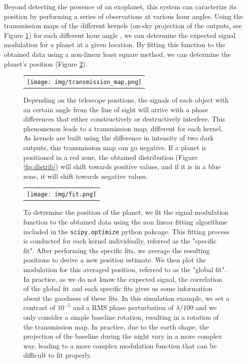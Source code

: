 \documentclass[]{spie}  %
\begin{document}
Beyond detecting the presence of an exoplanet, this system can caracterize its position by performing a series of observations at various hour angles. Using the transmission maps of the different kernels (on-sky projection of the outputs, see Figure \ref{fig:transmission_map}) for each different hour angle \cite{Chingaipe}, we can determine the expected signal modulation for a planet at a given location. By fitting this function to the obtained data using a non-linear least square method, we can determine the planet's position (Figure \ref{fig:fit}).

\begin{figure} [H]
    \begin{center}
    \begin{tabular}{c}
    \texttt{[image: img/transmission\_map.png]}
    \end{tabular}
    \end{center}
    \caption[transmission_map] 
    { \label{fig:transmission_map} 
    Depending on the telescope positions, the signals of each object with an certain angle from the line of sight will arrive with a phase differences that either constructively or destructively interfere. This phenomenon leads to a transmission map, different for each kernel. As kernels are built using the difference in intensity of two dark outputs, this transmission map can go negative. If a planet is positioned in a red zone, the obtained distribution (Figure \ref{fig:distrib}) will shift towards positive values, and if it is in a blue zone, it will shift towards negative values.}
\end{figure}

\begin{figure} [H]
    \begin{center}
    \begin{tabular}{c}
    \texttt{[image: img/fit.png]}
    \end{tabular}
    \end{center}
    \caption[fit] 
    {\label{fig:fit} 
    To determine the position of the planet, we fit the signal modulation function to the obtained data using the non linear fitting algorithme included in the \lstinline{scipy.optimize} python pakcage. This fitting process is conducted for each kernel individually, referred as the "specific fit". After performing the specific fits, we average the resulting positions to derive a new position estimate. We then plot the modulation for this averaged position, referred to as the "global fit". In practice, as we do not know the expected signal, the correlation of the global fit and each specific fits gives us some information about the goodness of these fits. In this simulation example, we set a contrast of $10^{-5}$ and a RMS phase perturbation of $\lambda / 100$ and we only consider a simple baseline rotation, resulting in a rotation of the transmission map. In practice, due to the earth shape, the projection of the baseline during the night vary in a more complex way, leading to a more complex modulation function that can be difficult to fit properly.}
\end{figure}
\end{document}

